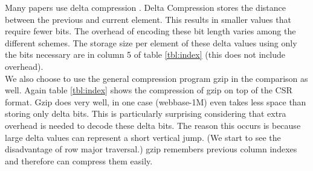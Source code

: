 \par Many papers use delta compression \cite{prelim:townsend, prelim:kourtis, prelim:kestur}. Delta Compression stores the distance between the previous and current element. This results in smaller values that require fewer bits. The overhead of encoding these bit length varies among the different schemes. The storage size per element of these delta values using only the bits necessary are in column 5 of table \ref{tbl:index} (this does not include overhead).\\
\indent We also choose to use the general compression program gzip in the comparison as well. Again table \ref{tbl:index} shows the compression of gzip on top of the CSR format. Gzip does very well, in one case (webbase-1M) even takes less space than storing only delta bits. This is particularly surprising considering that extra overhead is needed to decode these delta bits. The reason this occurs is because large delta values can represent a short vertical jump. (We start to see the disadvantage of row major traversal.) gzip remembers previous column indexes and therefore can compress them easily.\\%
